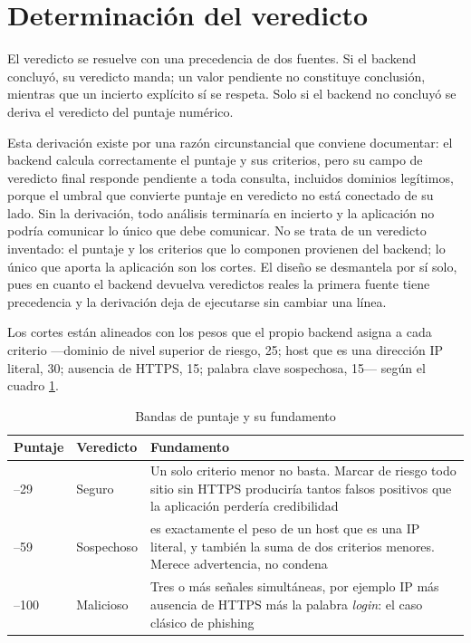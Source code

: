\section{Determinación del veredicto}

El veredicto se resuelve con una precedencia de dos fuentes. Si el backend concluyó, su
veredicto manda; un valor pendiente no constituye conclusión, mientras que un incierto
explícito sí se respeta. Solo si el backend no concluyó se deriva el veredicto del
puntaje numérico.

Esta derivación existe por una razón circunstancial que conviene documentar: el backend
calcula correctamente el puntaje y sus criterios, pero su campo de veredicto final
responde pendiente a toda consulta, incluidos dominios legítimos, porque el umbral que
convierte puntaje en veredicto no está conectado de su lado. Sin la derivación, todo
análisis terminaría en incierto y la aplicación no podría comunicar lo único que debe
comunicar. No se trata de un veredicto inventado: el puntaje y los criterios que lo
componen provienen del backend; lo único que aporta la aplicación son los cortes. El
diseño se desmantela por sí solo, pues en cuanto el backend devuelva veredictos reales
la primera fuente tiene precedencia y la derivación deja de ejecutarse sin cambiar una
línea.

Los cortes están alineados con los pesos que el propio backend asigna a cada criterio
---dominio de nivel superior de riesgo, 25; host que es una dirección IP literal, 30;
ausencia de HTTPS, 15; palabra clave sospechosa, 15--- según el cuadro
\ref{tab:bandas}.

\begin{table}[H]
    \centering
    \caption{Bandas de puntaje y su fundamento}
    \begin{tabular}{@{}>{\raggedright\arraybackslash}p{1.8cm}>{\raggedright\arraybackslash}p{2.2cm}>{\raggedright\arraybackslash}p{7.6cm}@{}}
        \toprule
        \textbf{Puntaje} & \textbf{Veredicto} & \textbf{Fundamento} \\
        \midrule
        0--29 & Seguro & Un solo criterio menor no basta. Marcar de riesgo todo sitio sin HTTPS produciría tantos falsos positivos que la aplicación perdería credibilidad \\
        30--59 & Sospechoso & 30 es exactamente el peso de un host que es una IP literal, y también la suma de dos criterios menores. Merece advertencia, no condena \\
        60--100 & Malicioso & Tres o más señales simultáneas, por ejemplo IP más ausencia de HTTPS más la palabra \emph{login}: el caso clásico de phishing \\
        \bottomrule
    \end{tabular}
    \label{tab:bandas}
\end{table}

